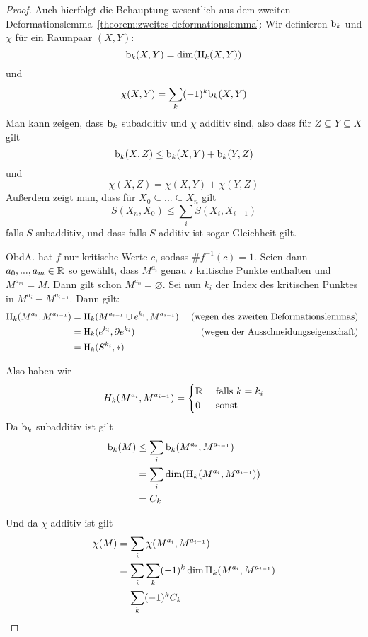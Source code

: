 \begin{proof}
    Auch hierfolgt die Behauptung wesentlich aus dem zweiten 
    Deformationslemma~\ref{theorem:zweites deformationslemma}:
    Wir definieren ${ \operatorname{b} }_k$ und $\chi$ für ein Raumpaar $(X, Y)$:
    \[ { \operatorname{b} }_k(X, Y) = \dim ({ \operatorname{H} }_k (X, Y)) \]
    und 
    \[ \chi(X, Y) = \sum_k (-1)^k { \operatorname{b} }_k(X, Y) \]
    Man kann zeigen, dass ${ \operatorname{b} }_k$ subadditiv und $\chi$ additiv sind, also
    dass für $Z \subseteq Y \subseteq X$ gilt
    \[ { \operatorname{b} }_k(X, Z) \leq { \operatorname{b} }_k(X, Y) + { \operatorname{b} }_k(Y, Z) \]
    und 
    \[ \chi(X, Z) = \chi(X, Y) + \chi(Y, Z) \]
    Außerdem zeigt man, dass für $X_0 \subseteq ... \subseteq X_n$ gilt
    \[ S(X_n, X_0) \leq \sum_i S(X_i, X_{i-1}) \]
    falls $S$ subadditiv, und dass falls $S$ additiv ist sogar Gleichheit gilt.
    
    ObdA. hat $f$ nur kritische Werte $c$, sodass $\#f^{-1}(c) = 1$. Seien dann 
    $a_0, ..., a_m \in { \mathbb R }$ so gewählt, dass $M^{a_i}$ genau $i$ kritische Punkte
    enthalten und $M^{a_m} = M$. Dann gilt schon $M^{a_0} = \varnothing$. Sei nun $k_i$
    der Index des kritischen Punktes in $M^{a_i} - M^{a_{i-1}}$. Dann gilt:
    \begin{align*}
        { \operatorname{H} }_k(M^{a_i}, M^{a_{i-1}}) 
            & = { \operatorname{H} }_k(M^{a_{i-1}} \cup e^{k_i}, M^{a_{i-1}})
            & \text{ (wegen des zweiten Deformationslemmas) } \\
        & = { \operatorname{H} }_k(e^{k_i}, { \partial } e^{k_i})
            & \text{ (wegen der Ausschneidungseigenschaft) } \\
        & = { \operatorname{H} }_k(S^{k_i}, \ast)
    \end{align*}

    Also haben wir
    \[ 
        H_k(M^{a_i}, M^{a_{i-1}}) = \begin{cases}
            { \mathbb R } &\text{ falls } k = k_i \\
            0 & \text{ sonst }
        \end{cases}
    \]
    Da ${ \operatorname{b} }_k$ subadditiv ist gilt 
    \begin{align*}
        { \operatorname{b} }_k(M) 
           & \leq \sum_i { \operatorname{b} }_k(M^{a_i}, M^{a_{i-1}}) \\
           & = \sum_i \dim({ \operatorname{H} }_k(M^{a_i}, M^{a_{i-1}})) \\
           & = C_k
    \end{align*}
    
    Und da $\chi$ additiv ist gilt
    \begin{align*}
        \chi(M) 
           & = \sum_i \chi (M^{a_i}, M^{a_{i-1}}) \\
           & = \sum_i \sum_k (-1)^k \dim { \operatorname{H} }_k (M^{a_i}, M^{a_{i-1}}) \\
           & = \sum_k (-1)^k C_k
    \end{align*}


\end{proof}
